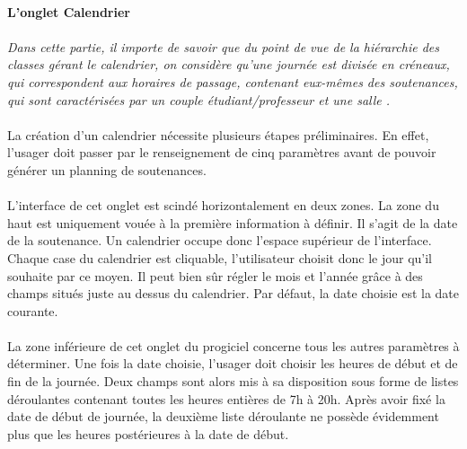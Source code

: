 \documentclass[a4paper,10pt]{report}
\begin{document}
	    \paragraph{L'onglet Calendrier}
	      \paragraph{}
		\textit{Dans cette partie, il importe de savoir que du point de vue de la hiérarchie des classes gérant le calendrier, on considère qu'une journée est divisée en créneaux, qui correspondent aux horaires de passage, contenant eux-mêmes des soutenances, qui sont caractérisées par un couple étudiant/professeur et une salle	.} 
		
	      \paragraph{}  
		La création d'un calendrier nécessite plusieurs étapes préliminaires.
		En effet, l'usager doit passer par le renseignement de cinq paramètres avant de pouvoir générer un planning de soutenances.
		
	      \paragraph{}
		L'interface de cet onglet est scindé horizontalement en deux zones.
		La zone du haut est uniquement vouée à la première information à définir.
		Il s'agit de la date de la soutenance.
		Un calendrier occupe donc l'espace supérieur de l'interface.
		Chaque case du calendrier est cliquable, l'utilisateur choisit donc le jour qu'il souhaite par ce moyen.
		Il peut bien sûr régler le mois et l'année grâce à des champs situés juste au dessus du calendrier.
		Par défaut, la date choisie est la date courante.
		
	      \paragraph{}
		La zone inférieure de cet onglet du progiciel concerne tous les autres paramètres à déterminer.
		Une fois la date choisie, l'usager doit choisir les heures de début et de fin de la journée.
		Deux champs sont alors mis à sa disposition sous forme de listes déroulantes contenant toutes les heures entières de 7h à 20h.
		Après avoir fixé la date de début de journée, la deuxième liste déroulante ne possède évidemment plus que les heures postérieures à la date de début.
		
\end{document}
